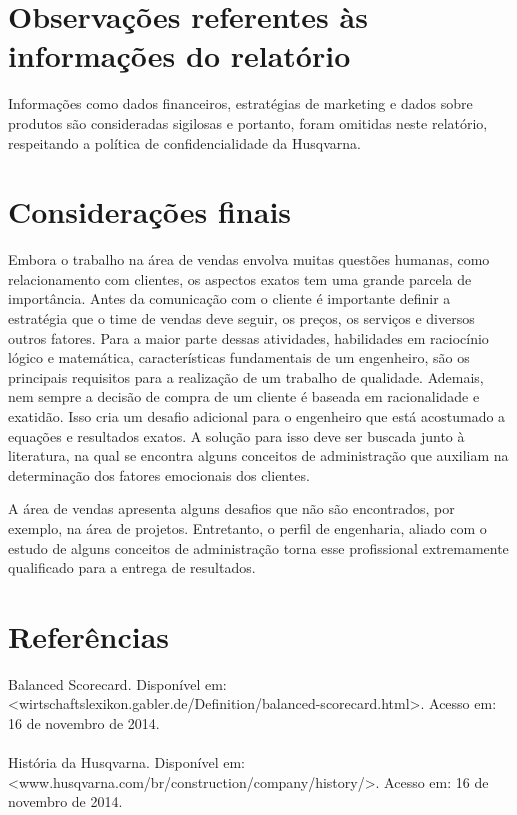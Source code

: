 \documentclass[12pt]{article}
\begin{document}
\pagebreak

\section{Observações referentes às informações do relatório
}
	Informações como dados financeiros, estratégias de marketing e dados sobre produtos são consideradas sigilosas e portanto, foram omitidas neste relatório, respeitando a política de confidencialidade da Husqvarna.
\pagebreak

\section{Considerações finais}
	
	Embora o trabalho na área de vendas envolva muitas questões humanas, como relacionamento com clientes, os aspectos exatos tem uma grande parcela de importância. Antes da comunicação com o cliente é importante definir a estratégia que o time de vendas deve seguir, os preços, os serviços e diversos outros fatores. Para a maior parte dessas atividades, habilidades em raciocínio lógico e matemática, características fundamentais de um engenheiro, são os principais requisitos para a realização de um trabalho de qualidade. Ademais, nem sempre a decisão de compra de um cliente é baseada em racionalidade e exatidão. Isso cria um desafio adicional para o engenheiro que está acostumado a equações e resultados exatos. A solução para isso deve ser buscada junto à literatura, na qual se encontra alguns conceitos de administração que auxiliam na determinação dos fatores emocionais dos clientes.
	
	A área de vendas apresenta alguns desafios que não são encontrados, por exemplo, na área de projetos. Entretanto, o perfil de engenharia, aliado com o estudo de alguns conceitos de administração torna esse profissional extremamente qualificado para a entrega de resultados.
\pagebreak

\section{Referências}
	{
		\noindent
		Balanced Scorecard. Disponível em: <wirtschaftslexikon.gabler.de/Definition/balanced-scorecard.html>. Acesso em: 16 de novembro de 2014. \\
		\\
		História da Husqvarna. Disponível em: <www.husqvarna.com/br/construction/company/history/>. Acesso em: 16 de novembro de 2014. \\
	}
\pagebreak
\end{document}

